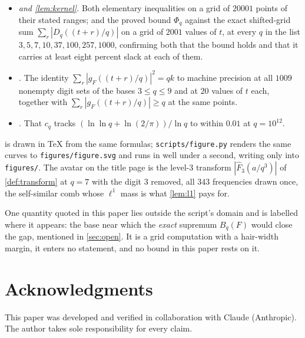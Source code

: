 \documentclass[11pt]{amsart}
\theoremstyle{definition}
\theoremstyle{remark}
\begin{document}
\begin{itemize}
  \item \emph{ and \cref{lem:kernel}.} Both elementary inequalities on a grid of $20001$ points of their stated ranges; and the proved bound $\Phi_q$ against the exact shifted-grid sum $\sum_r |D_q((t+r)/q)|$ on a grid of $2001$ values of $t$, at every $q$ in the list $3, 5, 7, 10, 37, 100, 257, 1000$, confirming both that the bound holds and that it carries at least eight percent slack at each of them.
  \item \emph{.} The identity $\sum_r |g_F((t+r)/q)|^2 = qk$ to machine precision at all $1009$ nonempty digit sets of the bases $3 \le q \le 9$ and at $20$ values of $t$ each, together with $\sum_r |g_F((t+r)/q)| \ge q$ at the same points.
  \item \emph{.} That $c_q$ tracks $(\ln\ln q + \ln(2/\pi))/\ln q$ to within $0.01$ at $q = 10^{12}$.
\end{itemize}

 is drawn in \TeX{} from the same formulas; \texttt{scripts/figure.py} renders the same curves to \texttt{figures/figure.svg} and runs in well under a second, writing only into \texttt{figures/}. The avatar on the title page is the level-$3$ transform $|\widehat F_3(a/q^3)|$ of \cref{def:transform} at $q = 7$ with the digit $3$ removed, all $343$ frequencies drawn once, the self-similar comb whose $\ell^1$ mass is what \cref{lem:l1} pays for.

One quantity quoted in this paper lies outside the script's domain and is labelled where it appears: the base near which the \emph{exact} supremum $B_q(F)$ would close the gap, mentioned in \cref{sec:open}. It is a grid computation with a hair-width margin, it enters no statement, and no bound in this paper rests on it.

\section*{Acknowledgments}

This paper was developed and verified in collaboration with Claude (Anthropic). The author takes sole responsibility for every claim.
\end{document}

